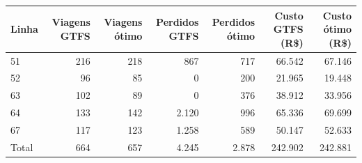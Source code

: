 \begin{tabular}{lrrrrrr}
\toprule
Linha & Viagens GTFS & Viagens ótimo & Perdidos GTFS & Perdidos ótimo & Custo GTFS (R\$) & Custo ótimo (R\$) \\
\midrule
51 & 216 & 218 & 867 & 717 & 66.542 & 67.146 \\
52 & 96 & 85 & 0 & 200 & 21.965 & 19.448 \\
63 & 102 & 89 & 0 & 376 & 38.912 & 33.956 \\
64 & 133 & 142 & 2.120 & 996 & 65.336 & 69.699 \\
67 & 117 & 123 & 1.258 & 589 & 50.147 & 52.633 \\
\midrule
Total & 664 & 657 & 4.245 & 2.878 & 242.902 & 242.881 \\
\bottomrule
\end{tabular}
